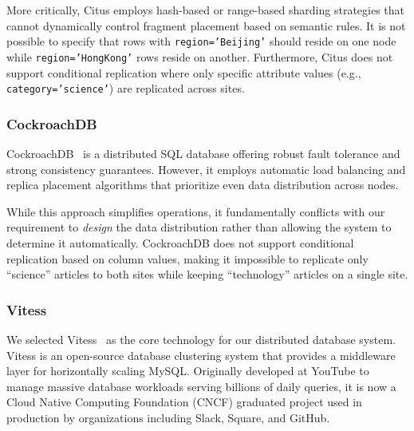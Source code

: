 \documentclass{article}
\begin{document}
More critically, Citus employs hash-based or range-based sharding strategies that cannot dynamically control fragment placement based on semantic rules. It is not possible to specify that rows with \texttt{region='Beijing'} should reside on one node while \texttt{region='HongKong'} rows reside on another. Furthermore, Citus does not support conditional replication where only specific attribute values (e.g., \texttt{category='science'}) are replicated across sites.

\subsubsection{CockroachDB}
CockroachDB~\citep{cockroachdb} is a distributed SQL database offering robust fault tolerance and strong consistency guarantees. However, it employs automatic load balancing and replica placement algorithms that prioritize even data distribution across nodes.

While this approach simplifies operations, it fundamentally conflicts with our requirement to \emph{design} the data distribution rather than allowing the system to determine it automatically. CockroachDB does not support conditional replication based on column values, making it impossible to replicate only ``science'' articles to both sites while keeping ``technology'' articles on a single site.

\subsubsection{Vitess}
We selected Vitess~\citep{vitess} as the core technology for our distributed database system. Vitess is an open-source database clustering system that provides a middleware layer for horizontally scaling MySQL. Originally developed at YouTube to manage massive database workloads serving billions of daily queries, it is now a Cloud Native Computing Foundation (CNCF) graduated project used in production by organizations including Slack, Square, and GitHub.
\end{document}
